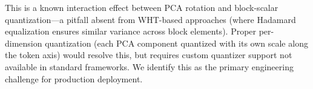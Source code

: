 This is a known interaction effect between PCA rotation and block-scalar quantization---a pitfall absent from WHT-based approaches (where Hadamard equalization ensures similar variance across block elements). Proper per-dimension quantization (each PCA component quantized with its own scale along the token axis) would resolve this, but requires custom quantizer support not available in standard frameworks. We identify this as the primary engineering challenge for production deployment.
